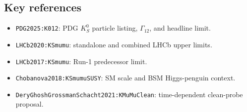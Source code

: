 \subsection*{Key references}
\begin{itemize}
\item \texttt{PDG2025:K012}: PDG \(K_S^0\) particle listing, \(\Gamma_{12}\), and headline limit.
\item \texttt{LHCb2020:KSmumu}: standalone and combined LHCb upper limits.
\item \texttt{LHCb2017:KSmumu}: Run-1 predecessor limit.
\item \texttt{Chobanova2018:KSmumuSUSY}: SM scale and BSM Higgs-penguin context.
\item \texttt{DeryGhoshGrossmanSchacht2021:KMuMuClean}: time-dependent clean-probe proposal.
\end{itemize}
